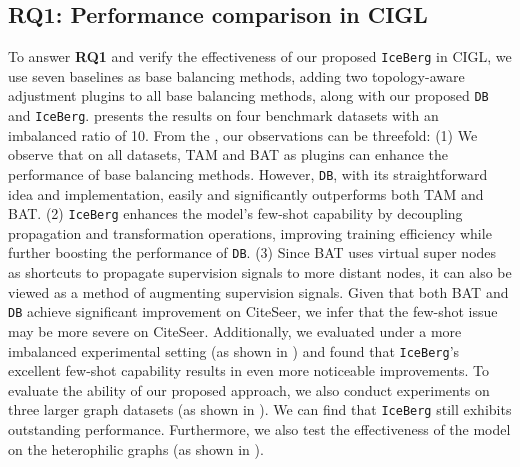 \subsection{RQ1: Performance comparison in CIGL}

To answer \textbf{RQ1} and verify the effectiveness of our proposed \texttt{IceBerg} in CIGL, we use seven baselines as base balancing methods, adding two topology-aware adjustment plugins to all base balancing methods, along with our proposed \texttt{DB} and \texttt{IceBerg}.  presents the results on four benchmark datasets with an imbalanced ratio of 10. From the , our observations can be threefold: (1) We observe that on all datasets, TAM and BAT as plugins can enhance the performance of base balancing methods. However, \texttt{DB}, with its straightforward idea and implementation, easily and significantly outperforms both TAM and BAT. (2) \texttt{IceBerg} enhances the model's few-shot capability by decoupling propagation and transformation operations, improving training efficiency while further boosting the performance of \texttt{DB}. (3) Since BAT uses virtual super nodes as shortcuts to propagate supervision signals to more distant nodes, it can also be viewed as a method of augmenting supervision signals. Given that both BAT and \texttt{DB} achieve significant improvement on CiteSeer, we infer that the few-shot issue may be more severe on CiteSeer. Additionally, we evaluated under a more imbalanced experimental setting (as shown in ) and found that \texttt{IceBerg}'s excellent few-shot capability results in even more noticeable improvements. To evaluate the ability of our proposed approach, we also conduct experiments on three larger graph datasets (as shown in ). We can find that \texttt{IceBerg} still exhibits outstanding performance. Furthermore, we also test the effectiveness of the model on the heterophilic graphs (as shown in ).


